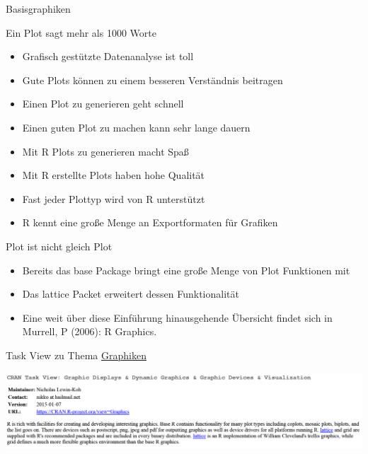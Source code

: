 \documentclass[ignorenonframetext,]{beamer}
\providecommand{\tightlist}{%
\setlength{\itemsep}{0pt}\setlength{\parskip}{0pt}}
\begin{document}
\begin{frame}[fragile]{Basisgraphiken}

\begin{block}{Ein Plot sagt mehr als 1000 Worte}

\begin{itemize}
\tightlist
\item
  Grafisch gestützte Datenanalyse ist toll
\item
  Gute Plots können zu einem besseren Verständnis beitragen
\item
  Einen Plot zu generieren geht schnell
\item
  Einen guten Plot zu machen kann sehr lange dauern
\item
  Mit R Plots zu generieren macht Spaß
\item
  Mit R erstellte Plots haben hohe Qualität
\item
  Fast jeder Plottyp wird von R unterstützt
\item
  R kennt eine große Menge an Exportformaten für Grafiken
\end{itemize}

\end{block}

\begin{block}{Plot ist nicht gleich Plot}

\begin{itemize}
\tightlist
\item
  Bereits das base Package bringt eine große Menge von Plot Funktionen
  mit
\item
  Das lattice Packet erweitert dessen Funktionalität
\item
  Eine weit über diese Einführung hinausgehende Übersicht findet sich in
  Murrell, P (2006): R Graphics.
\end{itemize}

\end{block}

\begin{block}{Task View zu Thema
\href{https://cran.r-project.org/web/views/Graphics.html}{Graphiken}}

\includegraphics{./tex2pdf.9796/5e4adb82cb6141da7bafecd33dfdc7d0e44f95dc.png}


\end{block}
\end{frame}
\end{document}
